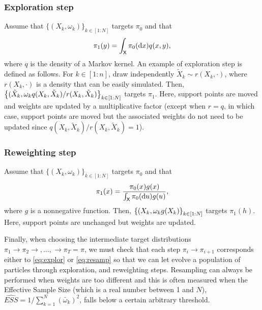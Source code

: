 \documentclass[english,graybox,envcountchap,envcountsame,sectrefs,shortlabels]{svmono}
\theoremstyle{style}
\newcommand{\eqsp}{}
\begin{document}
\subsubsection{Exploration step}
Assume that $\{(X_k,\omega_k)\}_{k\in[1:N]}$ targets $\pi_0$ and that
\begin{equation} \label{eq:explor}
\pi_1(y)=\int_\Xset \pi_0(\rmd x) q(x,y)\eqsp,
\end{equation}
where $q$ is the density of a Markov kernel. An example of exploration step is defined as follows. For $k\in[1:n]$, draw independently $\tilde X_k\sim r(X_k,\cdot)$, 
where $r(X_k,\cdot)$ is a density that can be easily simulated.
Then, $\left\{ (\tilde X_k,\omega_k q(X_k,\tilde X_k)/r(X_k,\tilde X_k)\right\}_{k\in[1:N]}$ targets $\pi_1$.
Here, support points are moved and weights are updated by a multiplicative factor (except when $r=q$, in which case, support points are moved but the associated weights do not need to be updated  since $ q(X_k,\tilde X_k)/r(X_k,\tilde X_k)=1$).
\subsubsection{Reweighting step}
Assume that $\{(X_k,\omega_k)\}_{k\in[1:N]}$ targets $\pi_0$ and that
\begin{equation} \label{eq:resamp}
\pi_1(x)=\frac{ \pi_0(x) g(x) }{\int_{\mathsf{X}} \pi_0(\mathrm{d} u) g(u) },
\end{equation}
where $g$ is a nonnegative function. Then,  $\left\{ (X_k,\omega_k g(X_k) \right\}_{k\in[1:N]}$ targets $\pi_1(h)$. Here, support points are unchanged but weights are updated.

Finally, when choosing the intermediate target distributions $\pi_1\rightarrow \pi_2\rightarrow,\ldots,\rightarrow \pi_T=\pi$, we must check that each step $\pi_i \rightarrow \pi_{i+1}$ corresponds either to \eqref{eq:explor} or \eqref{eq:resamp} so that we can let evolve a population of particles through exploration, and reweighting steps. Resampling can always be performed when weights are too different and this is often measured when the Effective Sample Size (which is a real number between 1 and $N$), $\widehat{ESS}=1/\sum_{k=1}^N (\bar \omega_k)^2$, falls below a certain arbitrary threshold.
\end{document}
